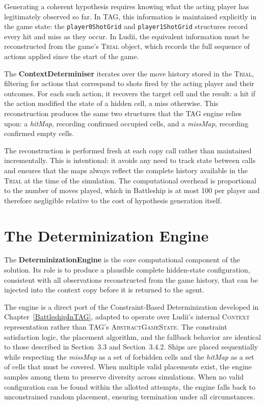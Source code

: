Generating a coherent hypothesis requires knowing what the acting player has legitimately observed so far. In TAG, this information is maintained explicitly in the game state: the \texttt{player0ShotGrid} and \texttt{player1ShotGrid} structures record every hit and miss as they occur. In Ludii, the equivalent information must be reconstructed from the game's \textsc{Trial} object, which records the full sequence of actions applied since the start of the game.

The \textbf{ContextDeterminiser} iterates over the move history stored in the \textsc{Trial}, filtering for actions that correspond to shots fired by the acting player and their outcomes. For each such action, it recovers the target cell and the result: a hit if the action modified the state of a hidden cell, a miss otherwise. This reconstruction produces the same two structures that the TAG engine relies upon: a \textit{hitMap}, recording confirmed occupied cells, and a \textit{missMap}, recording confirmed empty cells.

The reconstruction is performed fresh at each copy call rather than maintained incrementally. This is intentional: it avoids any need to track state between calls and ensures that the maps always reflect the complete history available in the \textsc{Trial} at the time of the simulation. The computational overhead is proportional to the number of moves played, which in Battleship is at most 100 per player and therefore negligible relative to the cost of hypothesis generation itself.


\section{The Determinization Engine}
\label{sec:det_engine}

The \textbf{DeterminizationEngine} is the core computational component of the solution. Its role is to produce a plausible complete hidden-state configuration, consistent with all observations reconstructed from the game history, that can be injected into the context copy before it is returned to the agent.

The engine is a direct port of the Constraint-Based Determinization developed in Chapter~\ref{BattleshipInTAG}, adapted to operate over Ludii's internal \textsc{Context} representation rather than TAG's \textsc{AbstractGameState}. The constraint satisfaction logic, the placement algorithm, and the fallback behavior are identical to those described in Section~3.3 and Section~3.4.2. Ships are placed sequentially while respecting the \textit{missMap} as a set of forbidden cells and the \textit{hitMap} as a set of cells that must be covered. When multiple valid placements exist, the engine samples among them to preserve diversity across simulations. When no valid configuration can be found within the allotted attempts, the engine falls back to unconstrained random placement, ensuring termination under all circumstances.

